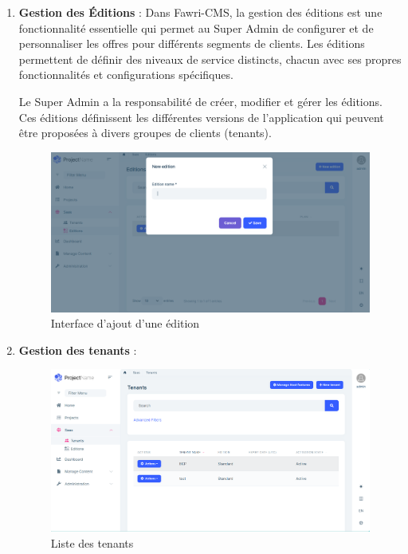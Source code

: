 \begin{enumerate}
    \item \textbf{Gestion des Éditions} :
    Dans Fawri-CMS, la gestion des éditions est une fonctionnalité essentielle qui permet au Super Admin de configurer et de personnaliser les offres pour différents segments de clients. Les éditions permettent de définir des niveaux de service distincts, chacun avec ses propres fonctionnalités et configurations spécifiques.

Le Super Admin a la responsabilité de créer, modifier et gérer les éditions. Ces éditions définissent les différentes versions de l'application qui peuvent être proposées à divers groupes de clients (tenants).

\begin{figure}[H] 
    \centering
    \includegraphics[width=17cm]{Figures/new edition.PNG}
    \caption{Interface d'ajout d'une édition}
\end{figure}

\item \textbf{Gestion des tenants} : 

\begin{figure}[H] 
    \centering
    \includegraphics[width=17cm]{Figures/tenant screenshot.PNG}
    \caption{Liste des tenants}
\end{figure}


\end{enumerate}
